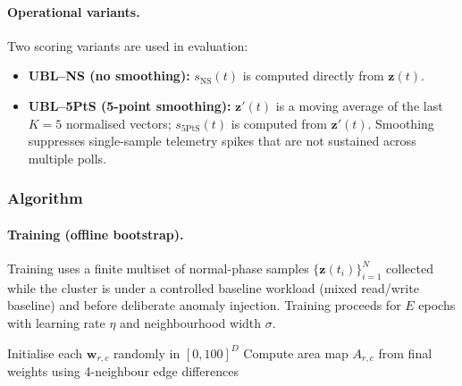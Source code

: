 \documentclass[11pt,a4paper]{article}
\begin{document}
\paragraph{Operational variants.}
Two scoring variants are used in evaluation:
\begin{itemize}[leftmargin=*]
  \item \textbf{UBL--NS (no smoothing):} $s_{\mathrm{NS}}(t)$ is computed directly from $\mathbf{z}(t)$.
  \item \textbf{UBL--5PtS (5-point smoothing):} $\mathbf{z}'(t)$ is a moving average of the last $K{=}5$ normalised vectors; $s_{\mathrm{5PtS}}(t)$ is computed from $\mathbf{z}'(t)$. Smoothing suppresses single-sample telemetry spikes that are not sustained across multiple polls.
\end{itemize}

\subsubsection{Algorithm}
\label{subsubsec:som-algorithm}

\paragraph{Training (offline bootstrap).}
Training uses a finite multiset of normal-phase samples $\{\mathbf{z}(t_i)\}_{i=1}^{N}$ collected while the cluster is under a controlled baseline workload (mixed read/write baseline) and before deliberate anomaly injection. Training proceeds for $E$ epochs with learning rate $\eta$ and neighbourhood width $\sigma$.

\begin{algorithm}[H]
\caption{Offline SOM training (batch, random shuffle per epoch)}
\label{alg:som-train}
\BlankLine
Initialise each $\mathbf{w}_{r,c}$ randomly in $[0,100]^D$\;
Compute area map $A_{r,c}$ from final weights using 4-neighbour edge differences\;
\;
\end{algorithm}
\end{document}
